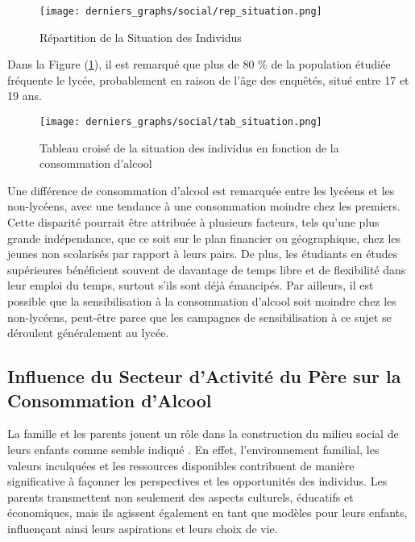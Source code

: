 \documentclass{article}
\begin{document}
\begin{figure}[H]
\centering
  
    \texttt{[image: derniers\_graphs/social/rep\_situation.png]}
    \caption{Répartition de la Situation des Individus}
    \label{fig:sociofig3}
    
\end{figure}

Dans la Figure (\ref{fig:sociofig3}), il est remarqué que plus de 80 \% de la population étudiée fréquente le lycée, probablement en raison de l'âge des enquêtés, situé entre 17 et 19 ans.

\begin{figure}[H]
  \centering
  \texttt{[image: derniers\_graphs/social/tab\_situation.png]} 
  \caption{Tableau croisé de la situation des individus en fonction de la consommation d'alcool}
  

  \label{fig:sociofig2}
\end{figure}
Une différence de consommation d'alcool est remarquée entre les lycéens et les non-lycéens, avec une tendance à une consommation moindre chez les premiers. Cette disparité pourrait être attribuée à plusieurs facteurs, tels qu'une plus grande indépendance, que ce soit sur le plan financier ou géographique, chez les jeunes non scolarisés par rapport à leurs pairs. De plus, les étudiants en études supérieures bénéficient souvent de davantage de temps libre et de flexibilité dans leur emploi du temps, surtout s'ils sont déjà émancipés. Par ailleurs, il est possible que la sensibilisation à la consommation d'alcool soit moindre chez les non-lycéens, peut-être parce que les campagnes de sensibilisation à ce sujet se déroulent généralement au lycée.



\subsection{Influence du Secteur d'Activité du Père sur la Consommation d'Alcool}
La famille et les parents jouent un rôle dans la construction du milieu social de leurs enfants comme semble indiqué \cite{article6}. En effet, l'environnement familial, les valeurs inculquées et les ressources disponibles contribuent de manière significative à façonner les perspectives et les opportunités des individus. Les parents transmettent non seulement des aspects culturels, éducatifs et économiques, mais ils agissent également en tant que modèles pour leurs enfants, influençant ainsi leurs aspirations et leurs choix de vie.
\end{document}
